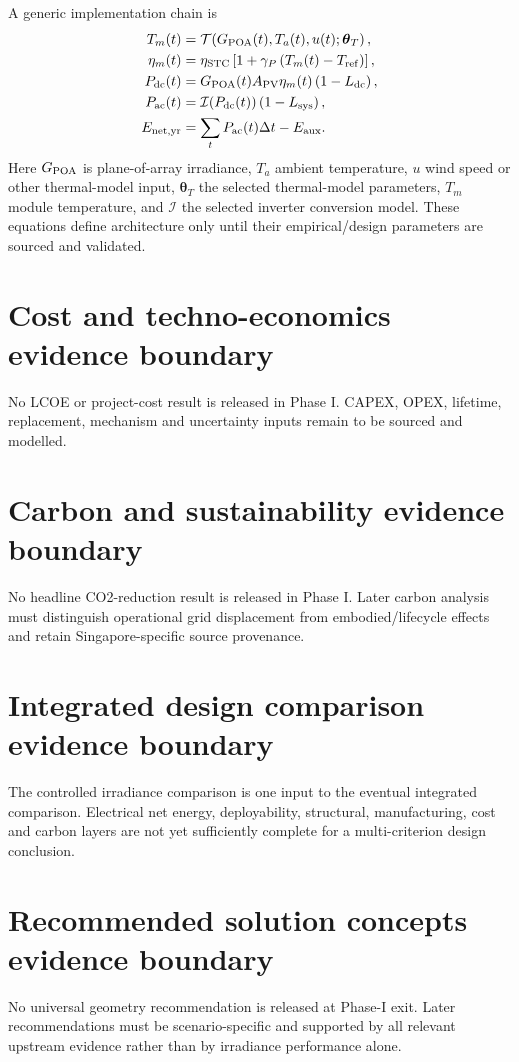 \documentclass[11pt,a4paper]{article}
\begin{document}
A generic implementation chain is
\begin{align}
T_m(t)&=\mathcal{T}\!\left(G_{\rm POA}(t),T_a(t),u(t);\boldsymbol\theta_T\right),\\
\eta_m(t)&=\eta_{\rm STC}\left[1+\gamma_P\left(T_m(t)-T_{\rm ref}\right)\right],\\
P_{\rm dc}(t)&=G_{\rm POA}(t)A_{\rm PV}\eta_m(t)\left(1-L_{\rm dc}\right),\\
P_{\rm ac}(t)&=\mathcal{I}\!\left(P_{\rm dc}(t)\right)\left(1-L_{\rm sys}\right),\\
E_{\rm net,yr}&=\sum_t P_{\rm ac}(t)\Delta t-E_{\rm aux}.
\end{align}
Here $G_{\rm POA}$ is plane-of-array irradiance, $T_a$ ambient temperature, $u$ wind speed or other thermal-model input, $\boldsymbol\theta_T$ the selected thermal-model parameters, $T_m$ module temperature, and $\mathcal{I}$ the selected inverter conversion model. These equations define architecture only until their empirical/design parameters are sourced and validated.

\section{Cost and techno-economics evidence boundary}
No LCOE or project-cost result is released in Phase I. CAPEX, OPEX, lifetime, replacement, mechanism and uncertainty inputs remain to be sourced and modelled.

\section{Carbon and sustainability evidence boundary}
No headline CO2-reduction result is released in Phase I. Later carbon analysis must distinguish operational grid displacement from embodied/lifecycle effects and retain Singapore-specific source provenance.

\section{Integrated design comparison evidence boundary}
The controlled irradiance comparison is one input to the eventual integrated comparison. Electrical net energy, deployability, structural, manufacturing, cost and carbon layers are not yet sufficiently complete for a multi-criterion design conclusion.

\section{Recommended solution concepts evidence boundary}
No universal geometry recommendation is released at Phase-I exit. Later recommendations must be scenario-specific and supported by all relevant upstream evidence rather than by irradiance performance alone.
\end{document}
